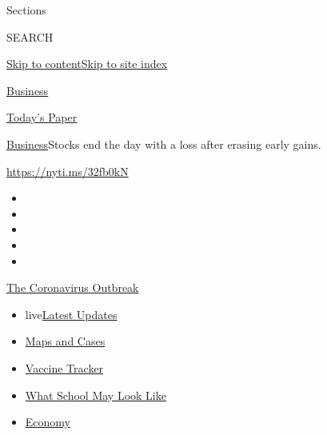 Sections

SEARCH

\protect\hyperlink{site-content}{Skip to
content}\protect\hyperlink{site-index}{Skip to site index}

\href{https://www.nytimes.com/section/business}{Business}

\href{https://myaccount.nytimes.com/auth/login?response_type=cookie\&client_id=vi}{}

\href{https://www.nytimes.com/section/todayspaper}{Today's Paper}

\href{/section/business}{Business}\textbar{}Stocks end the day with a
loss after erasing early gains.

\url{https://nyti.ms/32fb0kN}

\begin{itemize}
\item
\item
\item
\item
\item
\end{itemize}

\href{https://www.nytimes.com/news-event/coronavirus?action=click\&pgtype=Article\&state=default\&region=TOP_BANNER\&context=storylines_menu}{The
Coronavirus Outbreak}

\begin{itemize}
\tightlist
\item
  live\href{https://www.nytimes.com/2020/08/01/world/coronavirus-covid-19.html?action=click\&pgtype=Article\&state=default\&region=TOP_BANNER\&context=storylines_menu}{Latest
  Updates}
\item
  \href{https://www.nytimes.com/interactive/2020/us/coronavirus-us-cases.html?action=click\&pgtype=Article\&state=default\&region=TOP_BANNER\&context=storylines_menu}{Maps
  and Cases}
\item
  \href{https://www.nytimes.com/interactive/2020/science/coronavirus-vaccine-tracker.html?action=click\&pgtype=Article\&state=default\&region=TOP_BANNER\&context=storylines_menu}{Vaccine
  Tracker}
\item
  \href{https://www.nytimes.com/interactive/2020/07/29/us/schools-reopening-coronavirus.html?action=click\&pgtype=Article\&state=default\&region=TOP_BANNER\&context=storylines_menu}{What
  School May Look Like}
\item
  \href{https://www.nytimes.com/live/2020/07/31/business/stock-market-today-coronavirus?action=click\&pgtype=Article\&state=default\&region=TOP_BANNER\&context=storylines_menu}{Economy}
\end{itemize}

